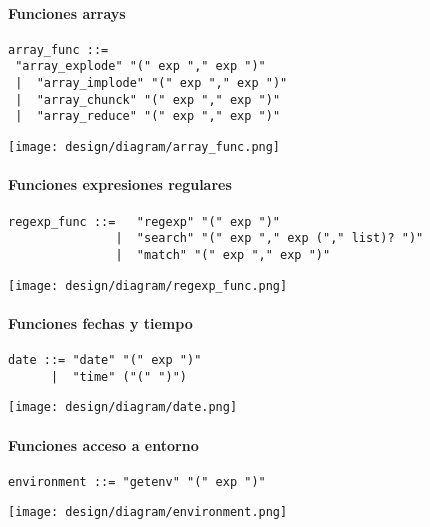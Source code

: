 \paragraph{Funciones arrays}
\begin{multicols}{2}
\begin{lstlisting}[style=nonumbers]      
array_func ::= 
 "array_explode" "(" exp "," exp ")"
 |  "array_implode" "(" exp "," exp ")"
 |  "array_chunck" "(" exp "," exp ")"
 |  "array_reduce" "(" exp "," exp ")"
\end{lstlisting}  
\columnbreak	
\begin{center}
\texttt{[image: design/diagram/array\_func.png]} 
\end{center}
\end{multicols}

\paragraph{Funciones expresiones regulares}
\begin{lstlisting}[style=nonumbers]      
regexp_func ::=   "regexp" "(" exp ")"
               |  "search" "(" exp "," exp ("," list)? ")"
               |  "match" "(" exp "," exp ")"
\end{lstlisting}  
\begin{center}
\texttt{[image: design/diagram/regexp\_func.png]} 
\end{center}

\paragraph{Funciones fechas y tiempo}
\begin{multicols}{2}
\begin{lstlisting}[style=nonumbers]      
date ::= "date" "(" exp ")"
      |  "time" ("(" ")")
\end{lstlisting}  
\columnbreak	
\begin{center}
\texttt{[image: design/diagram/date.png]} 
\end{center}
\end{multicols}

\paragraph{Funciones acceso a entorno}
\begin{multicols}{2}
\begin{lstlisting}[style=nonumbers]      
environment ::= "getenv" "(" exp ")"
\end{lstlisting}  
\columnbreak	
\begin{center}
\texttt{[image: design/diagram/environment.png]} 
\end{center}
\end{multicols}

